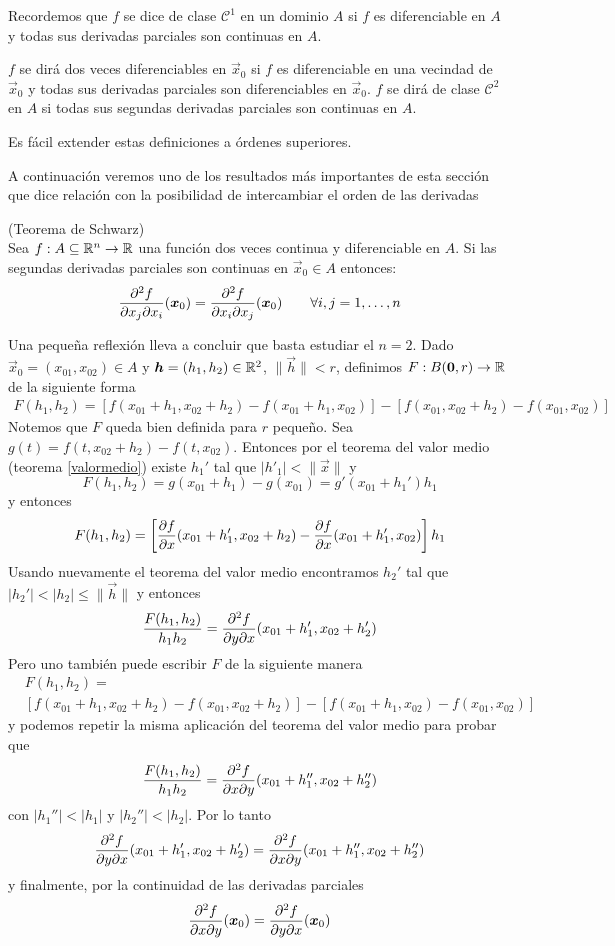 Recordemos que $f$ se dice de clase $\mathcal{C}^1$ en un dominio $A$ si $f$ es 
diferenciable en $A$ y todas sus derivadas parciales son continuas en $A$.

\begin{definicion}  $f$ se dir\'a dos veces diferenciables en $\vec{x}_0$ si $f$ es 
diferenciable en una vecindad de $\vec{x}_0$ y todas sus derivadas parciales 
son diferenciables en $\vec{x}_0$. $f$ se dir\'a de clase $\mathcal{C}^2$ en $A$ si todas
sus segundas derivadas parciales son continuas en $A$.
\end{definicion}
Es f\'acil extender estas definiciones a \'ordenes superiores.

A continuaci\'on veremos uno de los resultados m\'as importantes de 
esta secci\'on que dice relaci\'on con la posibilidad de intercambiar 
el orden de las derivadas

\begin{teorema}{\rm (Teorema de Schwarz)} 
\\Sea $\f1$ una funci\'on dos veces continua y diferenciable en $A$. Si las segundas derivadas parciales son continuas en $\vec{x}_0\in A$ entonces:$$\frac{\partial^2 f}{\partial x_j\partial x_i}(\boldsymbol{x}_0)=\frac{\partial^2 f}{\partial x_i\partial x_j}(\boldsymbol{x}_0)\qquad\forall i,j=1,\ldots,n$$
\end{teorema}

\begin{demostracion} 
Una peque\~na reflexi\'on lleva a concluir que basta 
estudiar el $n=2$. 
Dado $\vec{x}_0=(x_{01},x_{02})\in A$ y $\boldsymbol{h}=(h_1, h_2)\in\mathbb{R}^2$, $\|\vec{h}\|<r$, 
definimos $F:B(\boldsymbol{0},r)\to \mathbb{R}$ de la siguiente forma
\begin{eqnarray*}
F(h_1,h_2)=[f(x_{01}+h_1,x_{02}+h_2)-f(x_{01}+h_1,x_{02})]-[f(x_{01},x_{02}+h_2)-f(x_{01},x_{02})]
\end{eqnarray*}
Notemos que $F$ queda bien definida para $r$ peque\~no.
Sea $g(t)=f(t,x_{02}+h_2)-f(t,x_{02})$. Entonces por el teorema del valor
medio (teorema \ref{valormedio}) existe $h_1'$ tal que $|h'_1|<\|\vec{x}\|$ y
$$F(h_1,h_2)=g(x_{01}+h_1)-g(x_{01})=g'(x_{01}+h_1')h_1$$
y entonces
$$F(h_1,h_2)=\left[\frac{\partial f}{\partial x}(x_{01}+h'_1,x_{02}+h_2)-\frac{\partial f}{\partial x}(x_{01}+h'_1,x_{02})\right]h_1$$
Usando nuevamente el teorema del valor
medio encontramos $h_2'$ tal que $|h_2'| <|h_2|\le \|\vec{h}\|$ y entonces
$$
\frac{F(h_1,h_2)}{h_1h_2}=\frac{\partial^2 f}{\partial y\partial x}(x_{01}+h'_1,x_{02}+h_2')$$
Pero uno tambi\'en puede escribir $F$ de la siguiente manera
\begin{eqnarray*}
& F(h_1,h_2)=\\
& [f(x_{01}+h_1,x_{02}+h_2)-f(x_{01},x_{02}+h_2)]-[f(x_{01}+h_1,x_{02})-f(x_{01},x_{02})]
\end{eqnarray*}
y podemos  repetir la misma aplicaci\'on del teorema del valor
medio para  probar que
$$\frac{F(h_1,h_2)}{h_1h_2}=\frac{\partial^2 f}{\partial x\partial y}(x_{01}+h_1'',x_{02}+h_2'')$$
con $|h_1''|<|h_1|$ y $|h_2''|<|h_2|$.
Por lo tanto 
$$
\frac{\partial^2 f}{\partial y\partial x}(x_{01}+h_1',x_{02}+h_2')=\frac{\partial^2 f}{\partial x\partial y}(x_{01}+h_1'',x_{02}+h_2'')$$
y finalmente, por la continuidad de las derivadas parciales
$$\frac{\partial^2 f}{\partial x\partial y}(\boldsymbol{x}_0)=\frac{\partial^2 f}{\partial y\partial x}(\boldsymbol{x}_0)$$
\end{demostracion}

